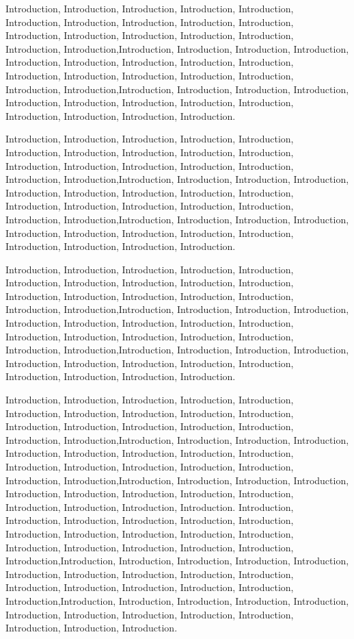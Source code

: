 Introduction, Introduction, Introduction, Introduction, Introduction, Introduction, Introduction, Introduction, Introduction, Introduction, Introduction, Introduction, Introduction, Introduction, Introduction, Introduction, Introduction,Introduction, Introduction, Introduction, Introduction, Introduction, Introduction, Introduction, Introduction, Introduction, Introduction, Introduction, Introduction, Introduction, Introduction, Introduction, Introduction,Introduction, Introduction, Introduction, Introduction, Introduction, Introduction, Introduction, Introduction, Introduction, Introduction, Introduction, Introduction, Introduction.

Introduction, Introduction, Introduction, Introduction, Introduction, Introduction, Introduction, Introduction, Introduction, Introduction, Introduction, Introduction, Introduction, Introduction, Introduction, Introduction, Introduction,Introduction, Introduction, Introduction, Introduction, Introduction, Introduction, Introduction, Introduction, Introduction, Introduction, Introduction, Introduction, Introduction, Introduction, Introduction, Introduction,Introduction, Introduction, Introduction, Introduction, Introduction, Introduction, Introduction, Introduction, Introduction, Introduction, Introduction, Introduction, Introduction.

Introduction, Introduction, Introduction, Introduction, Introduction, Introduction, Introduction, Introduction, Introduction, Introduction, Introduction, Introduction, Introduction, Introduction, Introduction, Introduction, Introduction,Introduction, Introduction, Introduction, Introduction, Introduction, Introduction, Introduction, Introduction, Introduction, Introduction, Introduction, Introduction, Introduction, Introduction, Introduction, Introduction,Introduction, Introduction, Introduction, Introduction, Introduction, Introduction, Introduction, Introduction, Introduction, Introduction, Introduction, Introduction, Introduction.

Introduction, Introduction, Introduction, Introduction, Introduction, Introduction, Introduction, Introduction, Introduction, Introduction, Introduction, Introduction, Introduction, Introduction, Introduction, Introduction, Introduction,Introduction, Introduction, Introduction, Introduction, Introduction, Introduction, Introduction, Introduction, Introduction, Introduction, Introduction, Introduction, Introduction, Introduction, Introduction, Introduction,Introduction, Introduction, Introduction, Introduction, Introduction, Introduction, Introduction, Introduction, Introduction, Introduction, Introduction, Introduction, Introduction.
Introduction, Introduction, Introduction, Introduction, Introduction, Introduction, Introduction, Introduction, Introduction, Introduction, Introduction, Introduction, Introduction, Introduction, Introduction, Introduction, Introduction,Introduction, Introduction, Introduction, Introduction, Introduction, Introduction, Introduction, Introduction, Introduction, Introduction, Introduction, Introduction, Introduction, Introduction, Introduction, Introduction,Introduction, Introduction, Introduction, Introduction, Introduction, Introduction, Introduction, Introduction, Introduction, Introduction, Introduction, Introduction, Introduction.

